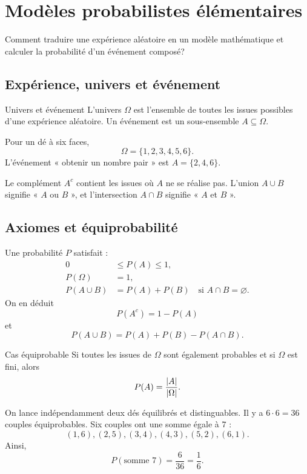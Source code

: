 \chapter{Modèles probabilistes élémentaires}
\label{manual:chapter:08}

\begin{questionbox}
Comment traduire une expérience aléatoire en un modèle mathématique et calculer la probabilité d'un événement composé?
\end{questionbox}

\section{Expérience, univers et événement}
\label{manual:section:08.01}

\begin{definition}{Univers et événement}{}
L'univers $\Omega$ est l'ensemble de toutes les issues possibles d'une expérience aléatoire. Un événement est un sous-ensemble $A\subseteq\Omega$.
\end{definition}

Pour un dé à six faces,
\[
\Omega=\{1,2,3,4,5,6\}.
\]
L'événement « obtenir un nombre pair » est $A=\{2,4,6\}$.

Le complément $A^c$ contient les issues où $A$ ne se réalise pas. L'union $A\cup B$ signifie « $A$ ou $B$ », et l'intersection $A\cap B$ signifie « $A$ et $B$ ».

\section{Axiomes et équiprobabilité}
\label{manual:section:08.02}

Une probabilité $P$ satisfait :
\begin{align*}
0&\le P(A)\le1,\\
P(\Omega)&=1,\\
P(A\cup B)&=P(A)+P(B)\quad\text{si }A\cap B=\varnothing.
\end{align*}
On en déduit
\[
P(A^c)=1-P(A)
\]
et
\[
P(A\cup B)=P(A)+P(B)-P(A\cap B).
\]

\begin{theorem}{Cas équiprobable}{}
Si toutes les issues de $\Omega$ sont également probables et si $\Omega$ est fini, alors
\[
P(A)=\frac{\left\lvert A\right\rvert}{\left\lvert \Omega\right\rvert}.
\]
\end{theorem}

\begin{examplebox}
On lance indépendamment deux dés équilibrés et distinguables. Il y a $6\cdot6=36$ couples équiprobables. Six couples ont une somme égale à $7$ :
\[
(1,6),(2,5),(3,4),(4,3),(5,2),(6,1).
\]
Ainsi,
\[
P(\text{somme }7)=\frac6{36}=\frac16.
\]
\end{examplebox}

